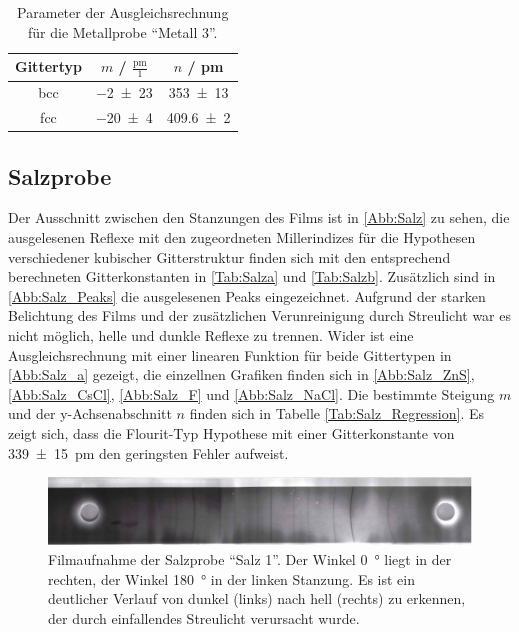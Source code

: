 \begin{table}[H]
  \centering
  \caption{Parameter der Ausgleichsrechnung für die Metallprobe \enquote{Metall 3}.}
  \label{Tab:Metall_Regression}
  \begin{tabular}{c | c c }
    \toprule
    Gittertyp &
    $m$ / $\frac{\mathrm{pm}}{1}$ &
    $n$ / pm \\
    \midrule
    bcc & \num{-2(23)} & \num{353(13)} \\
    fcc & \num{-20(4)} & \num{409.6(20)} \\
    \bottomrule
  \end{tabular}
\end{table}

\subsection{Salzprobe}
Der Ausschnitt zwischen den Stanzungen des Films ist in \autoref{Abb:Salz}
zu sehen, die ausgelesenen Reflexe mit den zugeordneten Millerindizes für die
Hypothesen verschiedener kubischer Gitterstruktur finden sich mit den entsprechend
berechneten Gitterkonstanten in \autoref{Tab:Salza} und \autoref{Tab:Salzb}.
Zusätzlich sind in \autoref{Abb:Salz_Peaks} die ausgelesenen Peaks eingezeichnet.
Aufgrund der starken Belichtung des Films und der zusätzlichen Verunreinigung durch Streulicht
war es nicht möglich, helle und dunkle Reflexe zu trennen.
Wider ist eine Ausgleichsrechnung mit einer linearen Funktion für beide Gittertypen in
\autoref{Abb:Salz_a} gezeigt, die einzellnen Grafiken finden sich in \autoref{Abb:Salz_ZnS},
\autoref{Abb:Salz_CsCl}, \autoref{Abb:Salz_F} und \autoref{Abb:Salz_NaCl}. Die bestimmte Steigung $m$ und der y-Achsenabschnitt $n$
finden sich in Tabelle \autoref{Tab:Salz_Regression}.
Es zeigt sich, dass die Flourit-Typ Hypothese mit einer Gitterkonstante von
\SI{339(15)}{\pico\metre} den geringsten Fehler aufweist.

\begin{figure}
  \centering
  \includegraphics[scale=0.5]{content/pics/Salz_film.pdf}
  \caption{Filmaufnahme der Salzprobe \enquote{Salz 1}. Der Winkel \SI{0}{\degree} liegt in der
  rechten, der Winkel \SI{180}{\degree} in der linken Stanzung. Es ist ein
  deutlicher Verlauf von dunkel (links) nach hell (rechts) zu erkennen, der durch
  einfallendes Streulicht verursacht wurde.}
  \label{Abb:Salz}
\end{figure}

